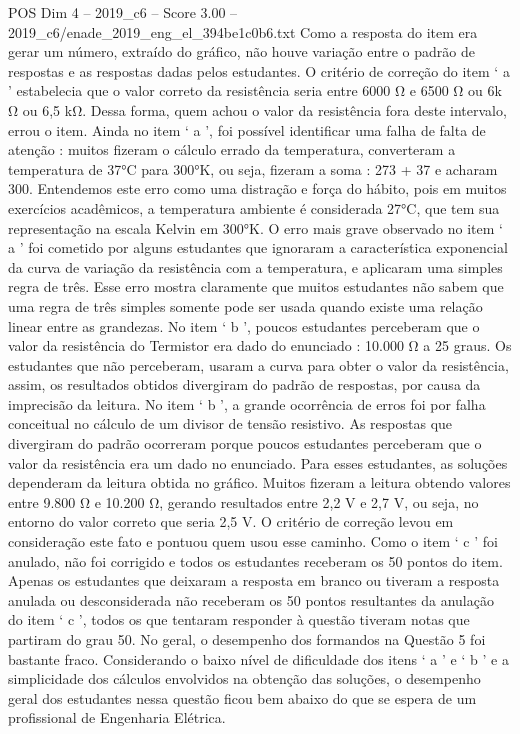 \begin{textsample}{POS Dim 4 – 2019\_c6 – Score 3.00 – 2019\_c6/enade\_2019\_eng\_el\_394be1c0b6.txt}
Como a resposta do item era gerar um número, extraído do gráfico, não houve variação entre o padrão de respostas e as respostas dadas pelos estudantes.
O critério de correção do item ‘ a ’ estabelecia que o valor correto da resistência seria entre 6000 Ω e 6500 Ω ou 6k Ω ou 6,5 kΩ.
Dessa forma, quem achou o valor da resistência fora deste intervalo, errou o item.
Ainda no item ‘ a ’, foi possível identificar uma falha de falta de atenção : muitos fizeram o cálculo errado da temperatura, converteram a temperatura de 37{\EmojiFont °}C para 300{\EmojiFont °}K, ou seja, fizeram a soma : 273 + 37 e acharam 300.
Entendemos este erro como uma distração e força do hábito, pois em muitos exercícios acadêmicos, a temperatura ambiente é considerada 27{\EmojiFont °}C, que tem sua representação na escala Kelvin em 300{\EmojiFont °}K.
O erro mais grave observado no item ‘ a ’ foi cometido por alguns estudantes que ignoraram a característica exponencial da curva de variação da resistência com a temperatura, e aplicaram uma simples regra de três.
Esse erro mostra claramente que muitos estudantes não sabem que uma regra de três simples somente pode ser usada quando existe uma relação linear entre as grandezas.
No item ‘ b ’, poucos estudantes perceberam que o valor da resistência do Termistor era dado do enunciado : 10.000 Ω a 25 graus.
Os estudantes que não perceberam, usaram a curva para obter o valor da resistência, assim, os resultados obtidos divergiram do padrão de respostas, por causa da imprecisão da leitura.
No item ‘ b ’, a grande ocorrência de erros foi por falha conceitual no cálculo de um divisor de tensão resistivo.
As respostas que divergiram do padrão ocorreram porque poucos estudantes perceberam que o valor da resistência era um dado no enunciado.
Para esses estudantes, as soluções dependeram da leitura obtida no gráfico.
Muitos fizeram a leitura obtendo valores entre 9.800 Ω e 10.200 Ω, gerando resultados entre 2,2 V e 2,7 V, ou seja, no entorno do valor correto que seria 2,5 V.
O critério de correção levou em consideração este fato e pontuou quem usou esse caminho.
Como o item ‘ c ’ foi anulado, não foi corrigido e todos os estudantes receberam os 50 pontos do item.
Apenas os estudantes que deixaram a resposta em branco ou tiveram a resposta anulada ou desconsiderada não receberam os 50 pontos resultantes da anulação do item ‘ c ’, todos os que tentaram responder à questão tiveram notas que partiram do grau 50.
No geral, o desempenho dos formandos na Questão 5 foi bastante fraco.
Considerando o baixo nível de dificuldade dos itens ‘ a ’ e ‘ b ’ e a simplicidade dos cálculos envolvidos na obtenção das soluções, o desempenho geral dos estudantes nessa questão ficou bem abaixo do que se espera de um profissional de Engenharia Elétrica.

\end{textsample}
